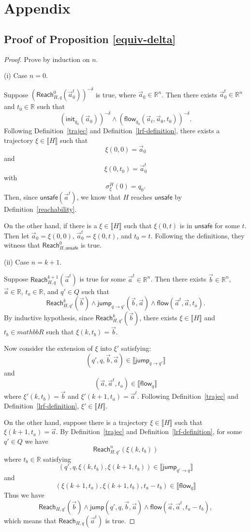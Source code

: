 \documentclass[envcountsect]{llncs}
\newcommand{\flow}{\mathsf{flow}}
\newcommand{\jump}{\mathsf{jump}}
\newcommand{\init}{\mathsf{init}}
\newcommand{\reach}{\mathsf{Reach}}
\newcommand{\unsafe}{\mathsf{unsafe}}
\begin{document}



\newpage
\section*{Appendix}

\subsection*{Proof of Proposition \ref{equiv-delta}}
\begin{proof}
Prove by induction on $n$.

(i) Case $n=0$.

Suppose $(\reach^0_{H,q}(\vec a_0^t))^{-\delta}$ is true, where $\vec a_0\in \mathbb{R}^n$. Then there exists $\vec a_0^t\in \mathbb{R}^n$ and $t_0\in \mathbb{R}$ such that
$$(\init_{q_0}(\vec a_0))^{-\delta}\wedge(\flow_{q_0}(\vec a_t, \vec a_0, t_0))^{-\delta}.$$
Following Definition~\ref{trajec} and Definition~\ref{lrf-definition}, there exists a trajectory $\xi\in \llbracket H\rrbracket$ such that
$$\xi(0,0) = \vec a_0$$
and 
$$\xi(0,t_0) = \vec a_0^t$$
with 
$$\sigma^H_{\xi}(0) = q_0.$$
Then, since $\unsafe(\vec a^t)$, we know that $H$ reaches $\unsafe$ by Definition~\ref{reachability}.

On the other hand, if there is a $\xi\in \llbracket H\rrbracket$ such that $\xi(0,t)$ is in $\unsafe$ for some $t$. Then let $\vec a_0 = \xi(0,0)$, $\vec a_0^t = \xi(0,t)$, and $t_0 = t$. Following the definitions, they witness that $\reach^0_{H,\unsafe}$ is true. 

(ii) Case $n=k+1$. 
 
Suppose $\reach_{H,q}^{k+1}(\vec a^t)$ is true for some $\vec a^t\in\mathbb{R}^n$. Then there exists $\vec b\in \mathbb{R}^n$, $\vec a\in \mathbb{R}$, $t_a\in \mathbb{R}$, and $q'\in Q$ such that
$$\reach_{H,q'}^k(\vec b) \wedge \jump_{q\rightarrow q'}(\vec b, \vec a)\wedge \flow(\vec a^t, \vec a, t_a).$$ 
By inductive hypothesis, since $\reach_{H,q'}^k(\vec b)$, there exists $\xi\in\llbracket H\rrbracket$ and $t_b\in mathbb{R}$ such that $\xi(k, t_b) = \vec b$. 


Now consider the extension of $\xi$ into $\xi'$ satisfying:
$$(q', q, \vec b, \vec a)\in \llbracket \jump_{q\rightarrow q'}\rrbracket$$
and 
$$(\vec a, \vec a^t, t_a)\in \llbracket \flow_q \rrbracket$$
where $\xi'(k,t_b) = \vec b$ and $\xi'(k+1, t_a) = \vec a^t$. Following Definition~\ref{trajec} and Definition~\ref{lrf-definition}, $\xi'\in \llbracket H\rrbracket$. 

On the other hand, suppose there is a trajectory $\xi\in\llbracket H\rrbracket$ such that $\xi(k+1, t_a) = \vec a$. By Definition~\ref{trajec} and Definition~\ref{lrf-definition}, for some $q'\in Q$ we have
$$\reach^n_{H,q'}(\xi(k,t_b))$$
where $t_b\in\mathbb{R}$ satisfying
$$(q', q, \xi(k,t_b), \xi(k+1,t_b))\in \llbracket \jump_{q'\rightarrow q} \rrbracket$$
and
$$(\xi(k+1,t_a), \xi(k+1,t_b), t_a - t_b)\in \llbracket \flow_q\rrbracket$$
Thus we have 
$$\reach_{H,q'}(\vec b)\wedge \jump(q',q,\vec b, \vec a)\wedge \flow(\vec a, \vec a^t, t_a-t_b),$$
which means that $\reach_{H,q}(\vec a^t)$ is true. 


\end{proof}
\end{document}
